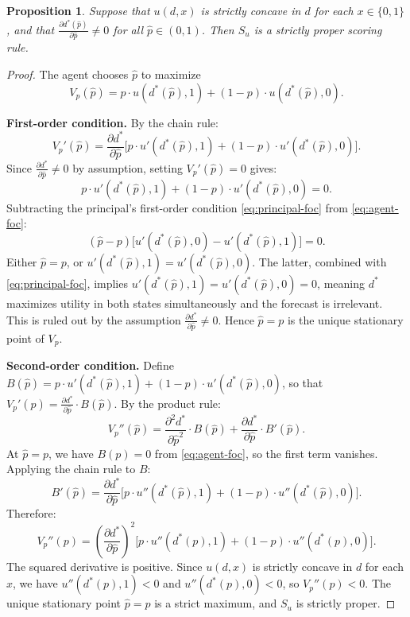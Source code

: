 \documentclass[11pt]{article}
\newtheorem{proposition}{Proposition}
\begin{document}
\begin{proposition}\label{prop:properness}
Suppose that $u(d, x)$ is strictly concave in $d$ for each $x \in \{0, 1\}$, and that $\frac{\partial d^*(\hat{p})}{\partial \hat{p}} \neq 0$ for all $\hat{p} \in (0,1)$. Then $S_u$ is a strictly proper scoring rule.
\end{proposition}

\begin{proof}
The agent chooses $\hat{p}$ to maximize
\[
V_p(\hat{p}) = p \cdot u(d^*(\hat{p}), 1) + (1 - p) \cdot u(d^*(\hat{p}), 0).
\]

\textbf{First-order condition.} By the chain rule:
\[
V_p'(\hat{p}) = \frac{\partial d^*}{\partial \hat{p}} \Big[ p \cdot u'(d^*(\hat{p}), 1) + (1 - p) \cdot u'(d^*(\hat{p}), 0) \Big].
\]
Since $\frac{\partial d^*}{\partial \hat{p}} \neq 0$ by assumption, setting $V_p'(\hat{p}) = 0$ gives:
\begin{equation}\label{eq:agent-foc}
p \cdot u'(d^*(\hat{p}), 1) + (1 - p) \cdot u'(d^*(\hat{p}), 0) = 0.
\end{equation}
Subtracting the principal's first-order condition \eqref{eq:principal-foc} from \eqref{eq:agent-foc}:
\[
(\hat{p} - p) \Big[ u'(d^*(\hat{p}), 0) - u'(d^*(\hat{p}), 1) \Big] = 0.
\]
Either $\hat{p} = p$, or $u'(d^*(\hat{p}), 1) = u'(d^*(\hat{p}), 0)$. The latter, combined with \eqref{eq:principal-foc}, implies $u'(d^*(\hat{p}), 1) = u'(d^*(\hat{p}), 0) = 0$, meaning $d^*$ maximizes utility in both states simultaneously and the forecast is irrelevant. This is ruled out by the assumption $\frac{\partial d^*}{\partial \hat{p}} \neq 0$. Hence $\hat{p} = p$ is the unique stationary point of $V_p$.

\textbf{Second-order condition.} Define $B(\hat{p}) = p \cdot u'(d^*(\hat{p}), 1) + (1 - p) \cdot u'(d^*(\hat{p}), 0)$, so that $V_p'(\hat{p}) = \frac{\partial d^*}{\partial \hat{p}} \cdot B(\hat{p})$. By the product rule:
\[
V_p''(\hat{p}) = \frac{\partial^2 d^*}{\partial \hat{p}^2} \cdot B(\hat{p}) + \frac{\partial d^*}{\partial \hat{p}} \cdot B'(\hat{p}).
\]
At $\hat{p} = p$, we have $B(p) = 0$ from \eqref{eq:agent-foc}, so the first term vanishes. Applying the chain rule to $B$:
\[
B'(\hat{p}) = \frac{\partial d^*}{\partial \hat{p}} \Big[ p \cdot u''(d^*(\hat{p}), 1) + (1 - p) \cdot u''(d^*(\hat{p}), 0) \Big].
\]
Therefore:
\[
V_p''(p) = \left( \frac{\partial d^*}{\partial \hat{p}} \right)^2 \Big[ p \cdot u''(d^*(p), 1) + (1 - p) \cdot u''(d^*(p), 0) \Big].
\]
The squared derivative is positive. Since $u(d, x)$ is strictly concave in $d$ for each $x$, we have $u''(d^*(p), 1) < 0$ and $u''(d^*(p), 0) < 0$, so $V_p''(p) < 0$. The unique stationary point $\hat{p} = p$ is a strict maximum, and $S_u$ is strictly proper.
\end{proof}
\end{document}
